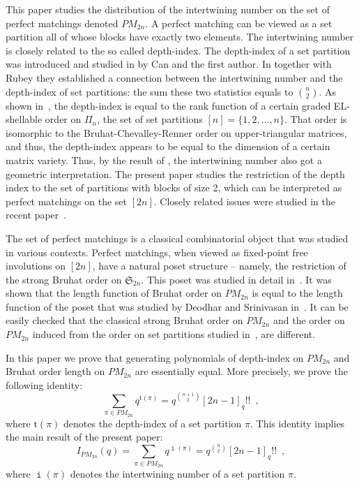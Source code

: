 \documentclass[11pt]{amsart}
\newcommand{\symm}[1]{\mathfrak{S}_{#1}}
\numberwithin{figure}{section}
\DeclareMathOperator{\inumber}{\mathtt i}
\theoremstyle{plain}
\theoremstyle{definition}
\begin{document}
This paper studies the distribution of the intertwining number on the set of perfect matchings denoted $PM_{2n}$. A perfect matching can be viewed as a set partition all of whose blocks have exactly two elements.
The intertwining number is closely related to the so called  depth-index. The  depth-index of a set partition was introduced and studied in \cite{StirlingPosets} by Can and the first author. In \cite{GeometricInterpretationIntertwiningNumber} together with Rubey they established a connection between the intertwining number and the depth-index of set partitions: the sum these two statistics equals to ${n\choose 2}$. 
As shown in~\cite{StirlingPosets}, the depth-index is equal to the rank function of a certain graded EL-shellable order on $\Pi_n$, the set of set partitions $[n]=\{1, 2,\ldots, n\}$. That order is isomorphic to the Bruhat-Chevalley-Renner order on upper-triangular matrices, and thus, the depth-index appears to be equal to the dimension of a certain matrix variety. Thus, by the result of \cite{GeometricInterpretationIntertwiningNumber}, the intertwining number also got a geometric interpretation.  
The present paper studies the restriction of the depth index to the set of partitions with blocks of size 2, which can be interpreted as perfect matchings on the set $[2n]$. Closely related issues were studied in the recent paper~\cite{SZ}.

The set of perfect matchings is a classical combinatorial object that was studied in various contexts. Perfect matchings, when viewed as fixed-point free involutions on $[2n]$, have a natural poset structure -- namely, the restriction of the strong Bruhat order on $\symm{2n}$. This poset was studied in detail in~\cite{LexicographicShellabilityBruhatInvolutions}. 
It was shown that the length function  of Bruhat order on $PM_{2n}$ is equal to the length function of the poset that was studied by Deodhar and Srinivasan in~\cite{DeodharSrinivasanStatisticOnInvolutions}. It can be easily checked that the classical strong Bruhat order on $PM_{2n}$ and the order on $PM_{2n}$ induced from the order on set partitions studied in~\cite{StirlingPosets}, are different. 

 In this paper we prove  that generating polynomials of depth-index on $PM_{2n}$ and Bruhat order length on $PM_{2n}$ are essentially equal. More precisely, we prove the following identity:
$$\sum_{\pi\in PM_{2n} }q^{\mathrm{t}(\pi)}=q^{\binom{n+1}{2}}[2n-1]_q!!\,\,\,,$$
where $\mathrm{t}(\pi)$ denotes the depth-index of a set partition $\pi$. This identity implies the main result of the present paper:  
$$I_{PM_{2n} }(q) = \sum_{\pi\in PM_{2n} }q^{\inumber(\pi) }=q^{\binom{n}{2}}[2n-1]_q!!\,\,\,,
$$
where $\inumber(\pi)$ denotes the intertwining number of a set partition $\pi$.
\end{document}
